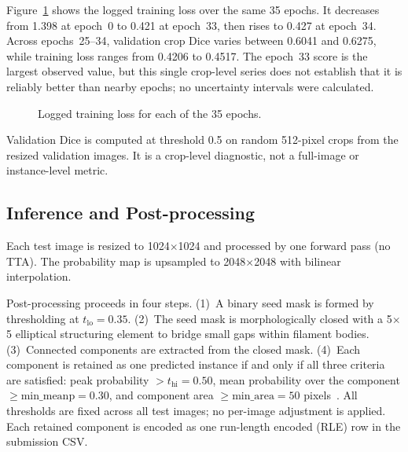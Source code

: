 \documentclass[sigconf]{acmart}
\begin{document}
Figure~\ref{fig:train-loss} shows the logged training loss over the
same 35 epochs. It decreases from 1.398 at epoch~0 to 0.421 at
epoch~33, then rises to 0.427 at epoch~34. Across epochs~25--34,
validation crop Dice varies between 0.6041 and 0.6275, while training
loss ranges from 0.4206 to 0.4517. The epoch~33 score is the largest
observed value, but this single crop-level series does not establish
that it is reliably better than nearby epochs; no uncertainty
intervals were calculated.

\begin{figure}[h]
\centering
{}
\caption{Logged training loss for each of the 35 epochs.}
\label{fig:train-loss}
\end{figure}

Validation Dice is computed at threshold 0.5 on random 512-pixel
crops from the resized validation images. It is a crop-level
diagnostic, not a full-image or instance-level metric.

\subsection{Inference and Post-processing}

Each test image is resized to 1024$\times$1024 and processed by one
forward pass (no TTA). The probability map is upsampled to
2048$\times$2048 with bilinear interpolation.

Post-processing proceeds in four steps. (1)~A binary seed mask is
formed by thresholding at $t_{\mathrm{lo}}=0.35$. (2)~The seed mask
is morphologically closed with a 5$\times$5 elliptical structuring
element to bridge small gaps within filament bodies. (3)~Connected
components are extracted from the closed mask. (4)~Each component is
retained as one predicted instance if and only if all three criteria
are satisfied: peak probability $>t_{\mathrm{hi}}=0.50$, mean
probability over the component $\geq\mathrm{min\_meanp}=0.30$, and
component area $\geq\mathrm{min\_area}=50$ pixels~\cite{afshar2026}.
All thresholds are fixed across all test images; no per-image
adjustment is applied. Each retained component is encoded as one
run-length encoded (RLE) row in the submission CSV.
\end{document}
